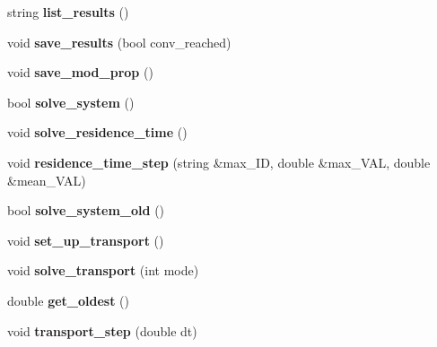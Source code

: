 \begin{DoxyCompactItemize}
\item 
string {\bfseries list\+\_\+results} ()\hypertarget{class_staci_a54bf8a354a57dbafda0bf775c66d6524}{}\label{class_staci_a54bf8a354a57dbafda0bf775c66d6524}

\item 
void {\bfseries save\+\_\+results} (bool conv\+\_\+reached)\hypertarget{class_staci_a0cf78089da2693f039b4fe5e2b5c21d2}{}\label{class_staci_a0cf78089da2693f039b4fe5e2b5c21d2}

\item 
void {\bfseries save\+\_\+mod\+\_\+prop} ()\hypertarget{class_staci_acd4cd93f1e82bc555915122bd77e3b67}{}\label{class_staci_acd4cd93f1e82bc555915122bd77e3b67}

\item 
bool {\bfseries solve\+\_\+system} ()\hypertarget{class_staci_a86917fe19f9c274dac7fbf5fd86e44ba}{}\label{class_staci_a86917fe19f9c274dac7fbf5fd86e44ba}

\item 
void {\bfseries solve\+\_\+residence\+\_\+time} ()\hypertarget{class_staci_a884616aaebef6a088c562e56c0f68525}{}\label{class_staci_a884616aaebef6a088c562e56c0f68525}

\item 
void {\bfseries residence\+\_\+time\+\_\+step} (string \&max\+\_\+\+ID, double \&max\+\_\+\+V\+AL, double \&mean\+\_\+\+V\+AL)\hypertarget{class_staci_a403aabb120769ddc037a69548b2c2134}{}\label{class_staci_a403aabb120769ddc037a69548b2c2134}

\item 
bool {\bfseries solve\+\_\+system\+\_\+old} ()\hypertarget{class_staci_ad9b04218bcc23ddc5b6e1d247f5ffb8f}{}\label{class_staci_ad9b04218bcc23ddc5b6e1d247f5ffb8f}

\item 
void {\bfseries set\+\_\+up\+\_\+transport} ()\hypertarget{class_staci_ac71d40c423576c540b594c7e3a7f1365}{}\label{class_staci_ac71d40c423576c540b594c7e3a7f1365}

\item 
void {\bfseries solve\+\_\+transport} (int mode)\hypertarget{class_staci_a8ac839cd977519ad3a6a6a5ba85f4d35}{}\label{class_staci_a8ac839cd977519ad3a6a6a5ba85f4d35}

\item 
double {\bfseries get\+\_\+oldest} ()\hypertarget{class_staci_a7dde80c0f00d33639f459fca9d7b1314}{}\label{class_staci_a7dde80c0f00d33639f459fca9d7b1314}

\item 
void {\bfseries transport\+\_\+step} (double dt)\hypertarget{class_staci_a82c116ba2e4338362e1efa7410acba07}{}\label{class_staci_a82c116ba2e4338362e1efa7410acba07}


\end{DoxyCompactItemize}
